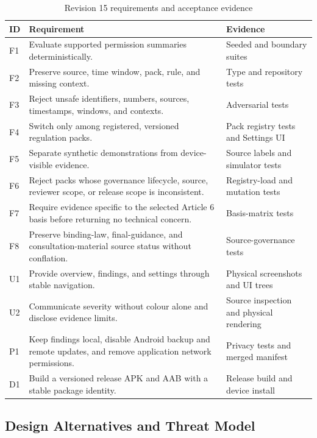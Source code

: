 \begin{table}[H]
\centering
\small
\caption{Revision 15 requirements and acceptance evidence}
\label{tab:r15-requirements}
\begin{tabular}{p{}p{}p{}}
\toprule
ID & Requirement & Evidence \\
\midrule
F1 & Evaluate supported permission summaries deterministically. & Seeded and boundary suites \\
F2 & Preserve source, time window, pack, rule, and missing context. & Type and repository tests \\
F3 & Reject unsafe identifiers, numbers, sources, timestamps, windows, and contexts. & Adversarial tests \\
F4 & Switch only among registered, versioned regulation packs. & Pack registry tests and Settings UI \\
F5 & Separate synthetic demonstrations from device-visible evidence. & Source labels and simulator tests \\
F6 & Reject packs whose governance lifecycle, source, reviewer scope, or release scope is inconsistent. & Registry-load and mutation tests \\
F7 & Require evidence specific to the selected Article 6 basis before returning no technical concern. & Basis-matrix tests \\
F8 & Preserve binding-law, final-guidance, and consultation-material source status without conflation. & Source-governance tests \\
U1 & Provide overview, findings, and settings through stable navigation. & Physical screenshots and UI trees \\
U2 & Communicate severity without colour alone and disclose evidence limits. & Source inspection and physical rendering \\
P1 & Keep findings local, disable Android backup and remote updates, and remove application network permissions. & Privacy tests and merged manifest \\
D1 & Build a versioned release APK and AAB with a stable package identity. & Release build and device install \\
\bottomrule
\end{tabular}
\end{table}

\subsection{Design Alternatives and Threat Model}

